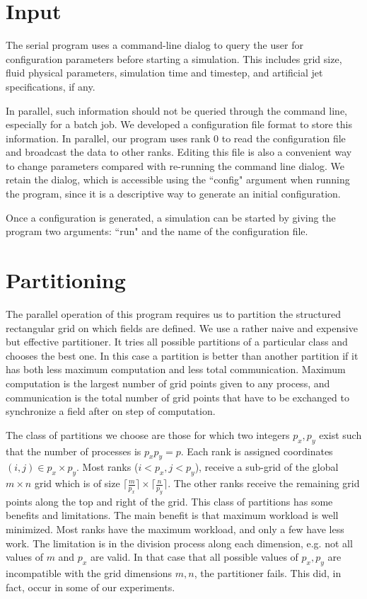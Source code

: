 \documentclass[twocolumn]{article}
\begin{document}
\section{Input}

The serial program uses a command-line dialog to query the user for
configuration parameters before starting a simulation.
This includes grid size, fluid physical parameters, simulation
time and timestep, and artificial jet specifications, if any.

In parallel, such information should not be queried through the
command line, especially for a batch job.
We developed a configuration file format to store this information.
In parallel, our program uses rank 0 to read the configuration file
and broadcast the data to other ranks.
Editing this file is also a convenient way to change parameters compared
with re-running the command line dialog.
We retain the dialog, which is accessible using the ``config" argument
when running the program, since it is a descriptive way to generate
an initial configuration.

Once a configuration is generated, a simulation can be started
by giving the program two arguments: ``run" and the name of the
configuration file.

\section{Partitioning}

The parallel operation of this program requires us to partition
the structured rectangular grid on which fields are defined.
We use a rather naive and expensive but effective partitioner.
It tries all possible partitions of a particular class
and chooses the best one.
In this case a partition is better than another partition
if it has both less maximum computation and less
total communication.
Maximum computation is the largest number of grid points given to
any process, and communication is the total number of grid points
that have to be exchanged to synchronize a field after on step
of computation.

The class of partitions we choose are those for which two integers
$p_x,p_y$ exist such that the number of processes is $p_xp_y=p$.
Each rank is assigned coordinates $(i,j)\in p_x\times p_y$.
Most ranks ($i<p_x,j<p_y$), receive a sub-grid of the global
$m\times n$ grid which is of size
$\lceil\frac{m}{p_x}\rceil\times \lceil\frac{n}{p_y}\rceil$.
The other ranks receive the remaining grid points along the top
and right of the grid.
This class of partitions has some benefits and limitations.
The main benefit is that maximum workload is well minimized.
Most ranks have the maximum workload, and only a few have less work.
The limitation is in the division process along each dimension,
e.g. not all values of $m$ and $p_x$ are valid.
In that case that all possible values of $p_x,p_y$ are incompatible with
the grid dimensions $m,n$, the partitioner fails.
This did, in fact, occur in some of our experiments.
\end{document}
